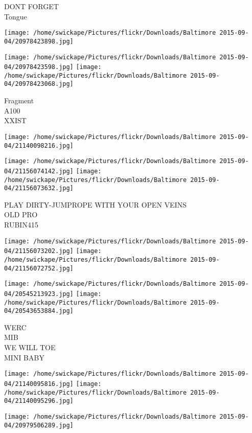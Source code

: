 \documentclass[10pt,letterpaper]{article}
\begin{document}
DONT FORGET\\
Tongue
\pagebreak

\texttt{[image: /home/swickape/Pictures/flickr/Downloads/Baltimore 2015-09-04/20978423898.jpg]}

\vspace{0.25in}
\texttt{[image: /home/swickape/Pictures/flickr/Downloads/Baltimore 2015-09-04/20978423598.jpg]}
\texttt{[image: /home/swickape/Pictures/flickr/Downloads/Baltimore 2015-09-04/20978423068.jpg]}

Fragment\\
A100\\
XXIST
\pagebreak

\texttt{[image: /home/swickape/Pictures/flickr/Downloads/Baltimore 2015-09-04/21140098216.jpg]}

\vspace{0.25in}
\texttt{[image: /home/swickape/Pictures/flickr/Downloads/Baltimore 2015-09-04/21156074142.jpg]}
\texttt{[image: /home/swickape/Pictures/flickr/Downloads/Baltimore 2015-09-04/21156073632.jpg]}

PLAY DIRTY{-}JUMPROPE WITH YOUR OPEN VEINS\\
OLD PRO\\
RUBIN415
\pagebreak

\texttt{[image: /home/swickape/Pictures/flickr/Downloads/Baltimore 2015-09-04/21156073202.jpg]}
\texttt{[image: /home/swickape/Pictures/flickr/Downloads/Baltimore 2015-09-04/21156072752.jpg]}

\texttt{[image: /home/swickape/Pictures/flickr/Downloads/Baltimore 2015-09-04/20545213923.jpg]}
\texttt{[image: /home/swickape/Pictures/flickr/Downloads/Baltimore 2015-09-04/20543653884.jpg]}

WERC\\
MIB\\
WE WILL TOE\\
MINI BABY
\pagebreak

\texttt{[image: /home/swickape/Pictures/flickr/Downloads/Baltimore 2015-09-04/21140095816.jpg]}
\texttt{[image: /home/swickape/Pictures/flickr/Downloads/Baltimore 2015-09-04/21140095296.jpg]}

\vspace{0.25in}
\texttt{[image: /home/swickape/Pictures/flickr/Downloads/Baltimore 2015-09-04/20979506289.jpg]}
\end{document}
